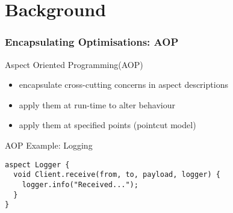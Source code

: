 \section{Background}

\begin{frame}[fragile]
  \frametitle{Encapsulating Optimisations: AOP}
  \begin{beamerboxesrounded}{Aspect Oriented Programming(AOP)}
    \begin{itemize}
      \item encapsulate cross-cutting concerns in aspect descriptions
      \item apply them at run-time to alter behaviour
      \item apply them at specified points (pointcut model)
    \end{itemize}
  \end{beamerboxesrounded}
\vspace{0.75cm}
\begin{beamerboxesrounded}{AOP Example: Logging}
\vspace{-0.5cm}
  \begin{lstlisting}[label=lst:label]
aspect Logger {
  void Client.receive(from, to, payload, logger) {
    logger.info("Received...");
  }
}
\end{lstlisting}
\end{beamerboxesrounded}


\end{frame}


